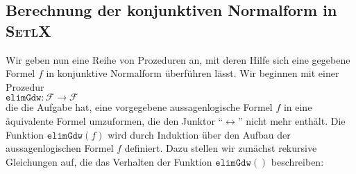\subsection{Berechnung der konjunktiven Normalform in \textsc{SetlX}}
Wir geben nun eine Reihe von Prozeduren an, mit deren Hilfe sich eine gegebene
Formel $f$ in konjunktive Normalform \"{u}berf\"{u}hren l\"{a}sst.  Wir beginnen mit einer
Prozedur 
\\[0.2cm]
\hspace*{1.3cm}
$\texttt{elimGdw}: \mathcal{F} \rightarrow \mathcal{F}$
\\[0.2cm]
die die Aufgabe hat, eine vorgegebene aussagenlogische Formel $f$ in eine \"{a}quivalente Formel
umzuformen, die den Junktor ``$\leftrightarrow$'' nicht mehr enth\"{a}lt.  Die Funktion
$\texttt{elimGdw}(f)$ wird durch Induktion \"{u}ber den Aufbau der aussagenlogischen Formel $f$ definiert.
Dazu stellen wir zun\"{a}chst rekursive Gleichungen auf,
die das Verhalten der Funktion $\texttt{elimGdw}()$ beschreiben:
